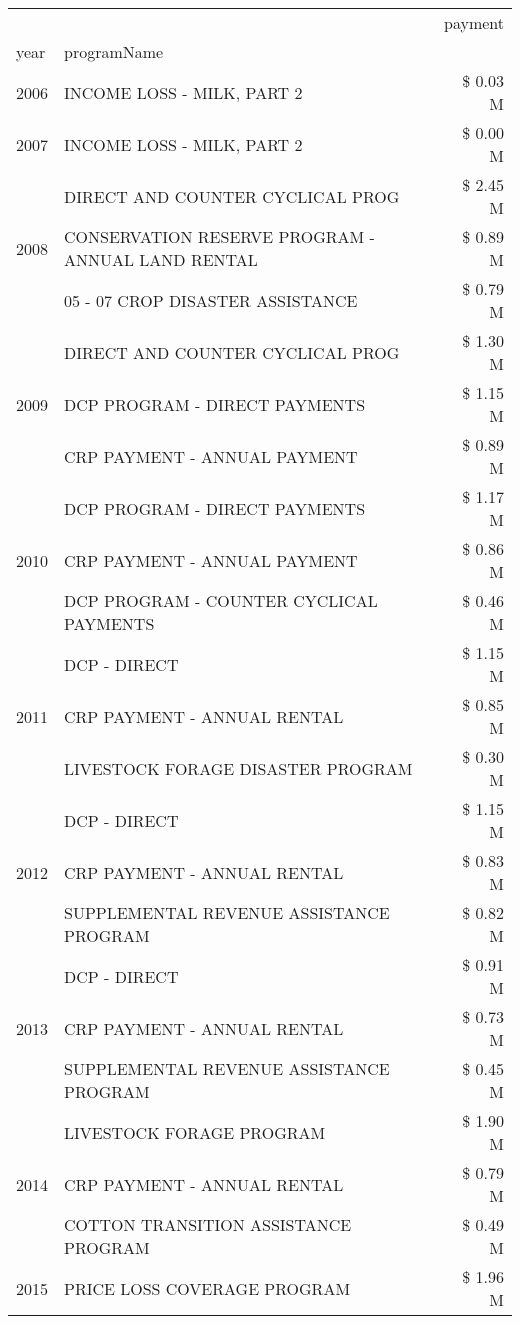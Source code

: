 \begin{tabular}{llr}
\toprule
 &  & payment \\
year & programName &  \\
\midrule
2006 & INCOME LOSS - MILK, PART 2 & \$ 0.03 M \\
\cline{1-3}
2007 & INCOME LOSS - MILK, PART 2 & \$ 0.00 M \\
\cline{1-3}
\multirow[t]{3}{*}{2008} & DIRECT AND COUNTER CYCLICAL PROG & \$ 2.45 M \\
 & CONSERVATION RESERVE PROGRAM - ANNUAL LAND RENTAL & \$ 0.89 M \\
 & 05 - 07 CROP DISASTER ASSISTANCE & \$ 0.79 M \\
\cline{1-3}
\multirow[t]{3}{*}{2009} & DIRECT AND COUNTER CYCLICAL PROG & \$ 1.30 M \\
 & DCP PROGRAM - DIRECT PAYMENTS & \$ 1.15 M \\
 & CRP PAYMENT - ANNUAL PAYMENT & \$ 0.89 M \\
\cline{1-3}
\multirow[t]{3}{*}{2010} & DCP PROGRAM - DIRECT PAYMENTS & \$ 1.17 M \\
 & CRP PAYMENT - ANNUAL PAYMENT & \$ 0.86 M \\
 & DCP PROGRAM - COUNTER CYCLICAL PAYMENTS & \$ 0.46 M \\
\cline{1-3}
\multirow[t]{3}{*}{2011} & DCP - DIRECT & \$ 1.15 M \\
 & CRP PAYMENT - ANNUAL RENTAL & \$ 0.85 M \\
 & LIVESTOCK FORAGE DISASTER PROGRAM & \$ 0.30 M \\
\cline{1-3}
\multirow[t]{3}{*}{2012} & DCP - DIRECT & \$ 1.15 M \\
 & CRP PAYMENT - ANNUAL RENTAL & \$ 0.83 M \\
 & SUPPLEMENTAL REVENUE ASSISTANCE PROGRAM & \$ 0.82 M \\
\cline{1-3}
\multirow[t]{3}{*}{2013} & DCP - DIRECT & \$ 0.91 M \\
 & CRP PAYMENT - ANNUAL RENTAL & \$ 0.73 M \\
 & SUPPLEMENTAL REVENUE ASSISTANCE PROGRAM & \$ 0.45 M \\
\cline{1-3}
\multirow[t]{3}{*}{2014} & LIVESTOCK FORAGE PROGRAM & \$ 1.90 M \\
 & CRP PAYMENT - ANNUAL RENTAL & \$ 0.79 M \\
 & COTTON TRANSITION ASSISTANCE PROGRAM & \$ 0.49 M \\
\cline{1-3}
\multirow[t]{3}{*}{2015} & PRICE LOSS COVERAGE PROGRAM & \$ 1.96 M \\

\end{tabular}
